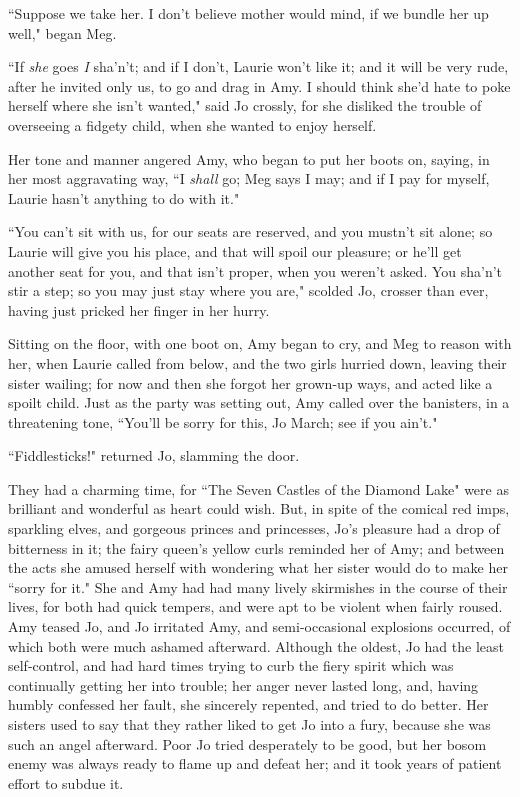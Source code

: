 ``Suppose we take her. I don't believe mother would mind,
if we bundle her up well," began Meg.

``If \emph{she} goes \emph{I} sha'n't;
and if I don't, Laurie won't like it;
and it will be very rude, after he invited only us, to go and drag in
Amy. I should think she'd hate to poke herself where she
isn't wanted," said Jo crossly, for she disliked the
trouble of overseeing a fidgety child, when she wanted to enjoy herself.

Her tone and manner angered Amy, who began to put her boots on, saying,
in her most aggravating way, ``I \emph{shall} go; Meg says I may; and if
I pay for myself, Laurie hasn't anything to do with it."

``You can't sit with us, for our seats are reserved, and
you mustn't sit alone; so Laurie will give you his
place, and that will spoil our pleasure; or he'll get
another seat for you, and that isn't proper, when you
weren't asked. You
sha'n't stir a step; so you may just
stay where you are," scolded Jo, crosser than ever, having just pricked
her finger in her hurry.

Sitting on the floor, with one boot on, Amy began to cry, and Meg to
reason with her, when Laurie called from below, and the two girls
hurried down, leaving their sister wailing; for now and then she forgot
her grown-up ways, and acted like a spoilt child. Just as the party was
setting out, Amy called over the banisters, in a threatening tone,
``You'll be sorry for this, Jo March; see if you
ain't."

``Fiddlesticks!" returned Jo, slamming the door.

They had a charming time, for ``The Seven Castles of the Diamond Lake"
were as brilliant and wonderful as heart could wish. But, in spite of
the comical red imps, sparkling elves, and gorgeous princes and
princesses, Jo's pleasure had a drop of bitterness in
it; the fairy queen's yellow curls reminded her of Amy;
and between the acts she amused herself with wondering what her sister
would do to make her ``sorry for it." She and Amy had had many lively
skirmishes in the course of their lives, for both had quick tempers, and
were apt to be violent when fairly roused. Amy teased Jo, and Jo
irritated Amy, and semi-occasional explosions occurred, of which both
were much ashamed afterward. Although the oldest, Jo had the least
self-control, and had hard times trying to curb the fiery spirit which
was continually getting her into trouble; her anger never lasted long,
and, having humbly confessed her fault, she sincerely repented, and
tried to do better. Her sisters used to say that they rather liked to
get Jo into a fury, because she was such an angel afterward. Poor Jo
tried desperately to be good, but her bosom enemy was always ready to
flame up and defeat her; and it took years of patient effort to subdue
it.

